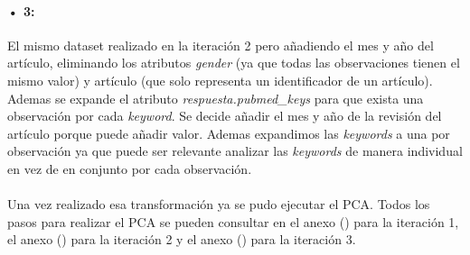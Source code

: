 \paragraph{• 3: } \label{section:pca_case3}El mismo dataset realizado en la iteración 2 pero añadiendo el mes y año del artículo, eliminando los atributos \textit{gender} (ya que todas las observaciones tienen el mismo valor) y artículo (que solo representa un identificador de un artículo). Ademas se expande el atributo \textit{respuesta.pubmed\_keys} para que exista una observación por cada \textit{keyword}. Se decide añadir el mes y año de la revisión del artículo porque puede añadir valor. Ademas expandimos las \textit{keywords} a una por observación ya que puede ser relevante analizar las \textit{keywords} de manera individual en vez de en conjunto por cada observación.

\paragraph{}
Una vez realizado esa transformación ya se pudo ejecutar el PCA. Todos los pasos para realizar el PCA se pueden consultar en el anexo () para la iteración 1, el anexo () para la iteración 2 y el anexo () para la iteración 3.
